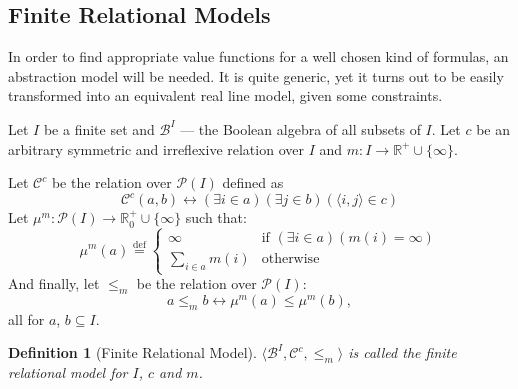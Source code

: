 \documentclass{article}
\newtheorem*{definition}{Definition}
\newcommand{\R}{\mathbb{R}}
\newcommand{\pwrset}{\mathcal{P}}
\newcommand{\B}{\mathcal{B}}
\newcommand{\eqdef}{\stackrel{\text{def}}{=}}
\begin{document}
\subsection{Finite Relational Models}
In order to find appropriate value functions for a well chosen kind of formulas, an abstraction model will be needed. It is quite generic, yet it turns out to be easily transformed into an equivalent real line model, given some constraints.

Let $I$ be a finite set and $\B^I$ --- the Boolean algebra of all subsets of $I$. Let $c$ be an arbitrary symmetric and irreflexive relation over $I$ and $m: I \rightarrow \R^+ \cup \{\infty\}$.

Let $\mathcal{C}^c$ be the relation over $\pwrset(I)$ defined as
\begin{equation*}
  \mathcal{C}^c(a, b) \longleftrightarrow (\exists i \in a)(\exists j \in b)(\langle i, j \rangle \in c)
\end{equation*}
Let $\mu^m: \pwrset(I) \rightarrow \R_0^+ \cup \{\infty\}$ such that:
\begin{equation*}
  \mu^m(a) \eqdef
  \begin{cases}
    \infty           & \text{if $(\exists i \in a)(m(i) = \infty)$} \\
    \sum_{i \in a}m(i) & \text{otherwise}
  \end{cases}
\end{equation*}
And finally, let $\leq_m$ be the relation over $\pwrset(I)$:
\begin{equation*}
  a \leq_m b \longleftrightarrow \mu^m(a) \leq \mu^m(b),
\end{equation*}
all for $a$, $b \subseteq I$.
\begin{definition}[Finite Relational Model]
$\langle \B^I, \mathcal{C}^c, \leq_m \rangle$ is called the \emph{finite relational model for $I$, $c$ and $m$}.
\end{definition}
\end{document}

